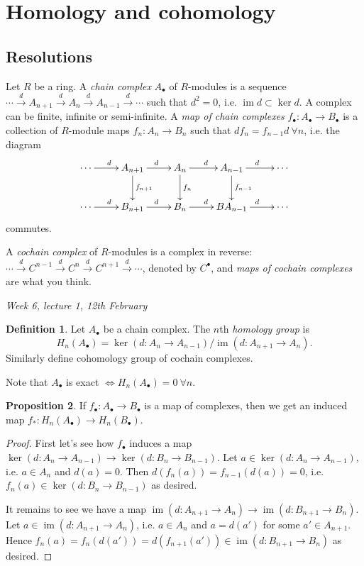 \documentclass{article}
\newcommand{\im}{\operatorname{im}}
\theoremstyle{definition}
\newtheorem{defn}{Definition}[subsection]
\newtheorem{prop}[defn]{Proposition}
\begin{document}
\section{Homology and cohomology}
\subsection{Resolutions}
Let $R$ be a ring. A \textit{chain complex} $A_\bullet$ of $R$-modules is a sequence $\cdots\xrightarrow{d}A_{n+1}\xrightarrow{d}A_n\xrightarrow{d}A_{n-1}\xrightarrow{d}\cdots$ such that $d^2=0$, i.e. $\im d\subset\ker d$. A complex can be finite, infinite or semi-infinite. A \textit{map of chain complexes} $f_\bullet:A_\bullet\rightarrow B_\bullet$ is a collection of $R$-module maps $f_n:A_n\rightarrow B_n$ such that $df_n=f_{n-1}d \ \forall n$, i.e. the diagram
\[
\xymatrix{
\cdots \ar[r]^d & A_{n+1} \ar[r]^d \ar[d]^{f_{n+1}} & A_n \ar[r]^d \ar[d]^{f_n} & A_{n-1} \ar[r]^d \ar[d]^{f_{n-1}} & \cdots \\
\cdots \ar[r]^d & B_{n+1} \ar[r]^d & B_n \ar[r]^d & BA_{n-1} \ar[r]^d & \cdots \\
}
\]
commutes.

A \textit{cochain complex} of $R$-modules is a complex in reverse: $\cdots\xrightarrow{d}C^{n-1}\xrightarrow{d}C^n\xrightarrow{d}C^{n+1}\xrightarrow{d}\cdots$, denoted by $C^\bullet$, and \textit{maps of cochain complexes} are what you think.

\begin{flushright}
\textit{Week 6, lecture 1, 12th February}
\end{flushright}

\begin{defn}
Let $A_\bullet$ be a chain complex. The $n$th \textit{homology group} is
\[
H_n(A_\bullet)=\ker(d:A_n\rightarrow A_{n-1})/\im(d:A_{n+1}\rightarrow A_n).
\]
Similarly define cohomology group of cochain complexes.
\end{defn}
Note that $A_\bullet$ is exact $\iff H_n(A_\bullet)=0 \ \forall n$.

\begin{prop}
If $f_\bullet:A_\bullet\rightarrow B_\bullet$ is a map of complexes, then we get an induced map $f_\ast:H_n(A_\bullet)\rightarrow H_n(B_\bullet)$.
\end{prop}
\begin{proof}
First let's see how $f_\bullet$ induces a map $\ker(d:A_n\rightarrow A_{n-1})\rightarrow\ker(d:B_n\rightarrow B_{n-1})$. Let $a\in\ker(d:A_n\rightarrow A_{n-1})$, i.e. $a\in A_n$ and $d(a)=0$. Then $d(f_n(a))=f_{n-1}(d(a))=0$, i.e. $f_n(a)\in\ker(d:B_n\rightarrow B_{n-1})$ as desired.

It remains to see we have a map $\im(d:A_{n+1}\rightarrow A_n)\rightarrow\im(d:B_{n+1}\rightarrow B_n)$. Let $a\in\im(d:A_{n+1}\rightarrow A_n)$, i.e. $a\in A_n$ and $a=d(a')$ for some $a'\in A_{n+1}$. Hence $f_n(a)=f_n(d(a'))=d(f_{n+1}(a'))\in\im(d:B_{n+1}\rightarrow B_n)$ as desired.
\end{proof}
\end{document}
